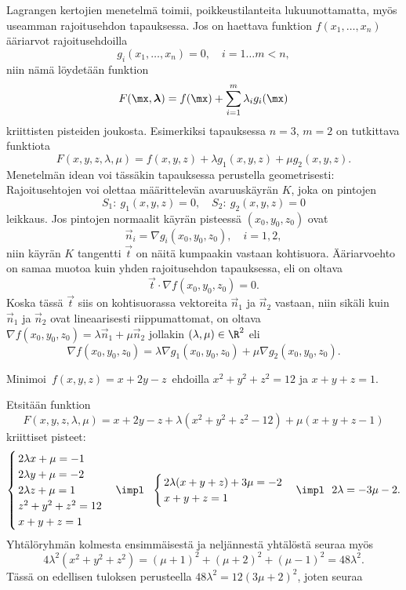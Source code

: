 Lagrangen kertojien menetelmä toimii, poikkeustilanteita lukuunottamatta, myös useamman 
rajoitusehdon tapauksessa. Jos on haettava funktion $f(x_1,\ldots,x_n)$ ääriarvot 
rajoitusehdoilla
\[
g_i(x_1,\ldots,x_n)=0,\quad i=1\ldots m<n,
\]
niin nämä löydetään funktion
\[
F(\mx,\boldsymbol{\lambda})=f(\mx)+\sum_{i=1}^m \lambda_i g_i(\mx)
\]
kriittisten pisteiden joukosta. Esimerkiksi tapauksessa $n=3$, $m=2$ on tutkittava funktiota
\[
F(x,y,z,\lambda,\mu)=f(x,y,z)+\lambda g_1(x,y,z)+\mu g_2(x,y,z).
\]
Menetelmän idean voi tässäkin tapauksessa perustella geometrisesti: Rajoitusehtojen voi olettaa
määrittelevän avaruuskäyrän $K$, joka on pintojen
\[
S_1: \ g_1(x,y,z)=0,\quad S_2: \ g_2(x,y,z)=0
\]
leikkaus. Jos pintojen normaalit käyrän pisteessä $(x_0,y_0,z_0)$ ovat
\[
\vec n_i=\nabla g_i(x_0,y_0,z_0),\quad i=1,2,
\]
niin käyrän $K$ tangentti $\vec t$ on näitä kumpaakin vastaan kohtisuora. Ääriarvoehto on samaa
muotoa kuin yhden rajoitusehdon tapauksessa, eli on oltava
\[
\vec t\cdot\nabla f(x_0,y_0,z_0)=0.
\]
Koska tässä $\vec t$ siis on kohtisuorassa vektoreita $\vec n_1$ ja $\vec n_2$ vastaan, niin
sikäli kuin $\vec n_1$ ja $\vec n_2$ ovat lineaarisesti riippumattomat, on oltava
$\nabla f(x_0,y_0,z_0)=\lambda\vec n_1+\mu\vec n_2$ jollakin $(\lambda,\mu)\in\R^2$ eli
\[
\nabla f(x_0,y_0,z_0)=\lambda\nabla g_1(x_0,y_0,z_0)+\mu\nabla g_2(x_0,y_0,z_0).
\]
\begin{Exa}
Minimoi $\,f(x,y,z)=x+2y-z\,$ ehdoilla $x^2+y^2+z^2=12$ ja $x+y+z=1$. 
\end{Exa}
\ratk Etsitään funktion 
\[ 
F(x,y,z,\lambda,\mu)=x+2y-z+\lambda(x^2+y^2+z^2-12)+\mu(x+y+z-1)
\]
kriittiset pisteet:
\[
\begin{cases}
 \,2\lambda x+\mu = -1 \\ 
 \,2\lambda y+\mu = -2 \\ 
 \,2\lambda z+\mu = 1 \\
 \,z^2+y^2+z^2 = 12 \\ 
 \,x+y+z = 1
\end{cases} 
\impl \ \ \begin{cases} \,2\lambda(x+y+z)+3\mu=-2 \\ \,x+y+z=1 \end{cases}
\impl \ \ 2\lambda=-3\mu-2.
\]
Yhtälöryhmän kolmesta ensimmäisestä ja neljännestä yhtälöstä seuraa myös
\[ 
4\lambda^2(x^2+y^2+z^2)=(\mu+1)^2+(\mu+2)^2+(\mu-1)^2=48\lambda^2 . 
\]
Tässä on edellisen tuloksen perusteella $48\lambda^2 = 12(3\mu+2)^2$, joten seuraa
